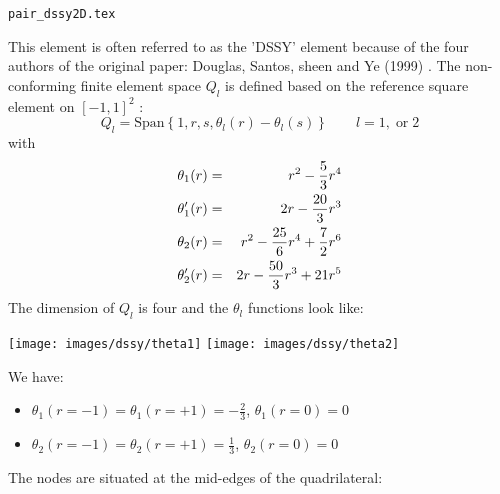 \begin{flushright} {\tiny {\color{gray} \tt pair\_dssy2D.tex}} \end{flushright}

This element is often referred to as the 'DSSY' element because of the 
four authors of the original paper: Douglas, Santos, sheen and Ye (1999) \cite{doss99}.
The non-conforming finite element space $Q_l$ is defined based on the 
reference square element on $[-1,1]^2$ :
\[
Q_l = \text{Span} \left\{ 1, r, s, \theta_l(r)-\theta_l(s)  \right\}
\qquad l=1,\; \text{or} \; 2
\]
with
\begin{eqnarray}
\theta_1(r)  &=& r^2-\frac53r^4  \nonumber\\
\theta_1'(r) &=& 2r-\frac{20}{3}r^3  \nonumber\\
\theta_2(r)  &=& r^2-\frac{25}{6} r^4 + \frac72 r^6 \\ 
\theta_2'(r) &=& 2r-\frac{50}{3} r^3 + 21 r^5
\end{eqnarray}
The dimension of $Q_l$ is four and the $\theta_l$ functions look like:
\begin{center}
\texttt{[image: images/dssy/theta1]}
\texttt{[image: images/dssy/theta2]}
\end{center}
We have:
\begin{itemize}
\item $\theta_1(r=-1)=\theta_1(r=+1)=-\frac23$, $\theta_1(r=0)=0$ 
\item $\theta_2(r=-1)=\theta_2(r=+1)=\frac13$, $\theta_2(r=0)=0$ 
\end{itemize}
The nodes are situated at the mid-edges of the quadrilateral:



